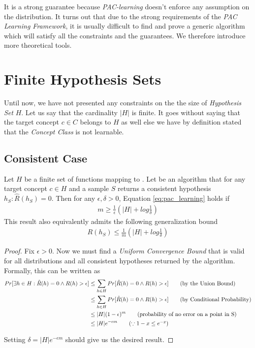 \documentclass[../toml]{subfiles}
\begin{document}
It is a strong guarantee because \textit{PAC-learning} doesn't enforce any assumption
on the distribution. It turns out that due to the strong requirements of the \textit{PAC
Learning Framework}, it is usually difficult to find and prove a generic algorithm
 which will satisfy all the constraints and the guarantees. We therefore
introduce more theoretical tools.

\section{Finite Hypothesis Sets}

Until now, we have not presented any constraints on the the size of \textit{Hypothesis
Set} $H$. Let us say that the cardinality $|H|$ is finite. It goes without saying that the
target concept $c \in C$ belongs to $H$ as well else we have by definition stated that
the \textit{Concept Class} is not learnable.

\subsection{Consistent Case}

\begin{theorem}
Let $H$ be a finite set of functions mapping  to . Let 
be an algorithm that for any target concept $c \in H$ and a sample $S$ returns a
consistent hypothesis $h_S: \hat{R}(h_S) = 0$. Then for any $\epsilon, \delta > 0$,
Equation \ref{eq:pac_learning} holds if
\begin{align}
m \geq \frac{1}{\epsilon} \left( |H| + log\frac{1}{\delta}\right) \label{th:fh_consistent_1}
\end{align}
This result also equivalently admits the following generalization bound
\begin{align}
R(h_S) \leq \frac{1}{m} \left( |H| + log\frac{1}{\delta}\right) \label{th:fh_consistent_2}
\end{align}
\end{theorem}

\begin{proof}
Fix $\epsilon > 0$. Now we must find a \textit{Uniform Convergence Bound} that is
valid for all distributions and all consistent hypotheses returned by the algorithm.
Formally, this can be written as
\begin{align}
Pr[\exists h \in H: \hat{R}(h) = 0 \land R(h) > \epsilon] &\leq \sum_{h \in H} Pr[\hat{R}(h) = 0 \land R(h) > \epsilon] \tag{by the Union Bound} \\
&\leq \sum_{h \in H} Pr[\hat{R}(h) = 0 \land R(h) > \epsilon] \tag{by Conditional Probability} \\
&\leq |H| (1-\epsilon)^m \tag{probability of no error on a point in S} \\
&\leq |H| e^{-\epsilon m} \tag{$\because 1-x\leq e^{-x}$}
\end{align}

Setting $\delta = |H| e^{-\epsilon m}$ should give us the desired result.
\end{proof}
\end{document}
